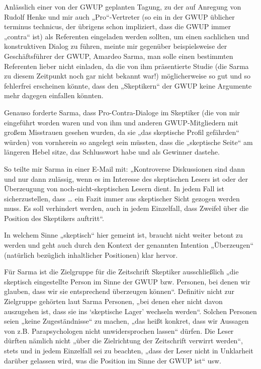 Anlässlich einer von der GWUP geplanten Tagung, zu der auf Anregung von
Rudolf Henke und mir auch „Pro``-Vertreter (so ein in der GWUP üblicher
terminus technicus, der übrigens schon impliziert, dass die GWUP immer
„contra`` ist) als Referenten eingeladen werden sollten, um einen
sachlichen und konstruktiven Dialog zu führen, meinte mir gegenüber
beispielsweise der Geschäftsführer der GWUP, Amardeo Sarma, man solle
einen bestimmten Referenten lieber nicht einladen, da die von ihm
präsentierte Studie (die Sarma zu diesem Zeitpunkt noch gar nicht
bekannt war!) möglicherweise so gut und so fehlerfrei erscheinen könnte,
dass den „Skeptikern`` der GWUP keine Argumente mehr dagegen einfallen
könnten.

Genauso forderte Sarma, dass Pro-Contra-Dialoge im Skeptiker (die von
mir eingeführt worden waren und von ihm und anderen GWUP-Mitgliedern mit
großem Misstrauen gesehen wurden, da sie „das skeptische Profil
gefährden`` würden) von vornherein so angelegt sein müssten, dass die
„skeptische Seite`` am längeren Hebel sitze, das Schlusswort habe und
als Gewinner dastehe.

So teilte mir Sarma in einer E-Mail mit: „Kontroverse Diskussionen sind
dann und nur dann zulässig, wenn es im Interesse des skeptischen Lesers
ist oder der Überzeugung von noch-nicht-skeptischen Lesern dient. In
jedem Fall ist sicherzustellen, dass \ldots{} ein Fazit immer aus
skeptischer Sicht gezogen werden muss. Es soll verhindert werden, auch
in jedem Einzelfall, dass Zweifel über die Position des Skeptikers
auftritt``.

In welchem Sinne „skeptisch`` hier gemeint ist, braucht nicht weiter
betont zu werden und geht auch durch den Kontext der genannten Intention
„Überzeugen`` (natürlich bezüglich inhaltlicher Positionen) klar hervor.

Für Sarma ist die Zielgruppe für die Zeitschrift Skeptiker
ausschließlich „die skeptisch eingestellte Person im Sinne der GWUP bzw.
Personen, bei denen wir glauben, dass wir sie entsprechend überzeugen
können``. Definitiv nicht zur Zielgruppe gehörten laut Sarma Personen,
„bei denen eher nicht davon auszugehen ist, dass sie ins `skeptische
Lager' wechseln werden``. Solchen Personen seien „keine Zugeständnisse``
zu machen, „das heißt konkret, dass wir Aussagen von z.B.
Parapsychologen nicht unwidersprochen lassen`` dürfen. Die Leser dürften
nämlich nicht „über die Zielrichtung der Zeitschrift verwirrt werden``,
stets und in jedem Einzelfall sei zu beachten, „dass der Leser nicht in
Unklarheit darüber gelassen wird, was die Position im Sinne der GWUP
ist`` usw.

